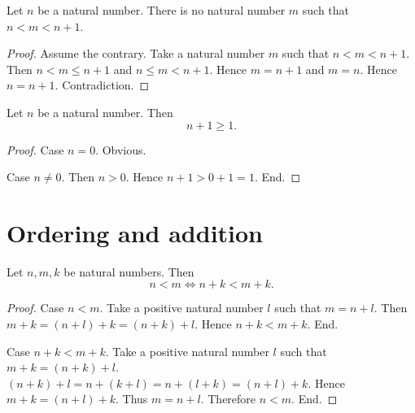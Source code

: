 \documentclass[../arithmetic.tex]{subfiles}
\begin{document}
  \begin{forthel}
    \begin{corollary}
      Let $n$ be a natural number.
      There is no natural number $m$ such that $n < m < n + 1$.
    \end{corollary}
    \begin{proof}
      Assume the contrary.
      Take a natural number $m$ such that $n < m < n + 1$.
      Then $n < m \leq n + 1$ and $n \leq m < n + 1$.
      Hence $m = n + 1$ and $m = n$.
      Hence $n = n + 1$.
      Contradiction.
    \end{proof}
  \end{forthel}

  \begin{forthel}
    \begin{proposition}
      Let $n$ be a natural number.
      Then \[ n + 1 \geq 1. \]
    \end{proposition}
    \begin{proof}
      Case $n = 0$. Obvious.

      Case $n \neq 0$.
        Then $n > 0$.
        Hence $n + 1 > 0 + 1 = 1$.
      End.
    \end{proof}
  \end{forthel}


  \section{Ordering and addition}

  \begin{forthel}
    \begin{proposition}
      Let $n, m, k$ be natural numbers.
      Then \[ n < m \iff n + k < m + k. \]
    \end{proposition}
    \begin{proof}
      Case $n < m$.
        Take a positive natural number $l$ such that $m = n + l$.
        Then $m + k
          = (n + l) + k
          = (n + k) + l$.
        Hence $n + k < m + k$.
      End.

      Case $n + k < m + k$.
        Take a positive natural number $l$ such that $m + k = (n + k) + l$.
        $(n + k) + l
          = n + (k + l)
          = n + (l + k)
          = (n + l) + k$.
        Hence $m + k = (n + l) + k$.
        Thus $m = n + l$.
        Therefore $n < m$.
      End.
    \end{proof}
  \end{forthel}
\end{document}
